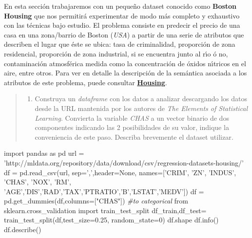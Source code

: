 \documentclass[11pt]{article}
\providecommand{\tightlist}{%
      \setlength{\itemsep}{0pt}\setlength{\parskip}{0pt}}
\newenvironment{Shaded}{}{}
\newcommand{\DecValTok}[1]{\textcolor[rgb]{0.25,0.63,0.44}{{#1}}}
\newcommand{\FloatTok}[1]{\textcolor[rgb]{0.25,0.63,0.44}{{#1}}}
\newcommand{\StringTok}[1]{\textcolor[rgb]{0.25,0.44,0.63}{{#1}}}
\newcommand{\CommentTok}[1]{\textcolor[rgb]{0.38,0.63,0.69}{\textit{{#1}}}}
\newcommand{\NormalTok}[1]{{#1}}
\newcommand{\ImportTok}[1]{{#1}}
\newcommand{\VariableTok}[1]{\textcolor[rgb]{0.10,0.09,0.49}{{#1}}}
\newcommand{\OperatorTok}[1]{\textcolor[rgb]{0.40,0.40,0.40}{{#1}}}
\begin{document}
En esta sección trabajaremos con un pequeño dataset conocido como
\textbf{Boston Housing} que nos permitirá experimentar de modo más
completo y exhaustivo con las técnicas bajo estudio. El problema
consiste en predecir el precio de una casa en una zona/barrio de Boston
(\emph{USA}) a partir de una serie de atributos que describen el lugar
que éste se ubica: tasa de criminalidad, proporción de zona residencial,
proporción de zona industrial, si se encuentra junto al rı́o ó no,
contaminación atmosférica medida como la concentración de óxidos
nı́tricos en el aire, entre otros. Para ver en detalle la descripción de
la semántica asociada a los atributos de este problema, puede consultar
\textbf{\href{https://archive.ics.uci.edu/ml/machine-learning-databases/housing/}{Housing}}.

\begin{quote}
\begin{enumerate}
\def\labelenumi{\alph{enumi})}
\tightlist
\item
  Construya un \emph{dataframe} con los datos a analizar descargando los
  datos desde la URL mantenida por los autores de \emph{The Elements of
  Statistical Learning}. Convierta la variable \emph{CHAS} a un vector
  binario de dos componentes indicando las 2 posibilidades de su valor,
  indique la conveniencia de este paso. Describa brevemente el dataset
  utilizar.
\end{enumerate}
\end{quote}

\begin{Shaded}
\begin{Highlighting}[]
\ImportTok{import}\NormalTok{ pandas }\ImportTok{as}\NormalTok{ pd}
\NormalTok{url }\OperatorTok{=} \StringTok{'http://mldata.org/repository/data/download/csv/regression-datasets-housing/'}
\NormalTok{df }\OperatorTok{=}\NormalTok{ pd.read_csv(url, sep}\OperatorTok{=}\StringTok{','}\NormalTok{,header}\OperatorTok{=}\VariableTok{None}\NormalTok{, names}\OperatorTok{=}\NormalTok{[}\StringTok{'CRIM'}\NormalTok{, }\StringTok{'ZN'}\NormalTok{, }\StringTok{'INDUS'}\NormalTok{, }\StringTok{'CHAS'}\NormalTok{, }\StringTok{'NOX'}\NormalTok{,}
    \StringTok{'RM'}\NormalTok{, }\StringTok{'AGE'}\NormalTok{,}\StringTok{'DIS'}\NormalTok{,}\StringTok{'RAD'}\NormalTok{,}\StringTok{'TAX'}\NormalTok{,}\StringTok{'PTRATIO'}\NormalTok{,}\StringTok{'B'}\NormalTok{,}\StringTok{'LSTAT'}\NormalTok{,}\StringTok{'MEDV'}\NormalTok{])}
\NormalTok{df }\OperatorTok{=}\NormalTok{ pd.get_dummies(df,columns}\OperatorTok{=}\NormalTok{[}\StringTok{"CHAS"}\NormalTok{]) }\CommentTok{#to categorical}
\ImportTok{from}\NormalTok{ sklearn.cross_validation }\ImportTok{import}\NormalTok{ train_test_split}
\NormalTok{df_train,df_test}\OperatorTok{=}\NormalTok{ train_test_split(df,test_size}\OperatorTok{=}\FloatTok{0.25}\NormalTok{, random_state}\OperatorTok{=}\DecValTok{0}\NormalTok{)}
\NormalTok{df.shape}
\NormalTok{df.info()}
\NormalTok{df.describe()}
\end{Highlighting}
\end{Shaded}
\end{document}
